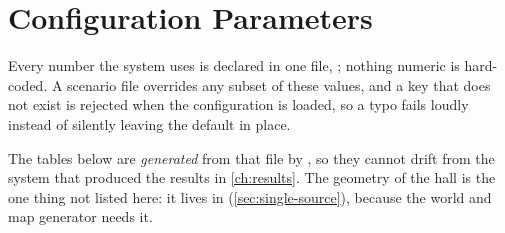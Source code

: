 \chapter{Configuration Parameters}
\label{app:configuration}

Every number the system uses is declared in one file, ;
nothing numeric is hard-coded. A scenario file overrides any subset of these values, and a key that
does not exist is rejected when the configuration is loaded, so a typo fails loudly instead of
silently leaving the default in place.

The tables below are \emph{generated} from that file by
, so they cannot drift from the system that produced the
results in \cref{ch:results}. The geometry of the hall is the one thing not listed here: it lives
in  (\cref{sec:single-source}), because the world and map generator needs it.




